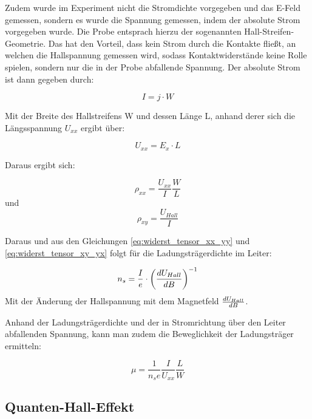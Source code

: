 Zudem wurde im Experiment nicht die Stromdichte vorgegeben und das E-Feld gemessen, sondern es wurde die Spannung gemessen, indem der absolute Strom vorgegeben wurde. Die Probe entsprach hierzu der sogenannten Hall-Streifen-Geometrie. 
Das hat den Vorteil, dass kein Strom durch die Kontakte fließt, an welchen die Hallspannung gemessen wird, sodass Kontaktwiderstände keine Rolle spielen, sondern nur die in der Probe abfallende Spannung. Der absolute Strom ist dann gegeben durch:

\begin{equation}
I=j \cdot W
\label{eq:absoluter_Strom}
\end{equation}

Mit der Breite des Hallstreifens W und dessen Länge L, anhand derer sich die Längsspannung $U_{xx}$ ergibt über:

\begin{equation}
U_{xx}=E_x \cdot L
\label{eq:laengsspannung}
\end{equation}

Daraus ergibt sich:

\begin{equation}
\rho_{xx}=\frac{U_{xx}}{I}\frac{W}{L}
\label{eq:rho_xx}
\end{equation}
und
\begin{equation}
\rho_{xy}=\frac{U_{Hall}}{I}
\label{eq:rho_xy}
\end{equation}

Daraus und aus den Gleichungen \ref{eq:widerst_tensor_xx_yy} und \ref{eq:widerst_tensor_xy_yx} folgt für die Ladungsträgerdichte im Leiter:
 
 \begin{equation}
 n_s=\frac{I}{e} \cdot \left( \frac{d U_{Hall}}{d B} \right)^{-1}
 \label{eq:ladungsdichte_steig}
 \end{equation}
 Mit der Änderung der Hallspannung mit dem Magnetfeld $\frac{d U_{Hall}}{d B}$. 
 
 Anhand der Ladungsträgerdichte und der in Stromrichtung über den Leiter abfallenden Spannung, kann man zudem die Beweglichkeit der Ladungsträger ermitteln:
 
 \begin{equation}
 \mu=\frac{1}{n_se}\frac{I}{U_{xx}}\frac{L}{W}
 \label{eq:bewegl_masse}
 \end{equation}


\subsection{Quanten-Hall-Effekt}


